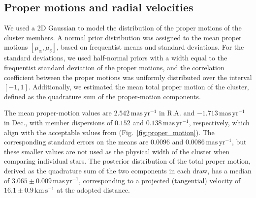 \documentclass{aa}
\begin{document}
\subsection{Proper motions and radial velocities}\label{subsec:pmrv}
We used a 2D Gaussian to model the distribution of the proper motions of the cluster members. A normal prior distribution was assigned to the mean proper motions $\left[\overline{\mu_\alpha},\overline{\mu_\delta}\right]$, based on frequentist means and standard deviations. For the standard deviations, we used half-normal priors with a width equal to the frequentist standard deviation of the proper motions, and the correlation coefficient between the proper motions was uniformly distributed over the interval $[-1, 1]$. Additionally, we estimated the mean total proper motion of the cluster, defined as the quadrature sum of the proper-motion components.

The mean proper-motion values are $2.542\,\mathrm{mas\,yr^{-1}}$ in R.A. and $-1.713\,\mathrm{mas\,yr^{-1}}$ in Dec., with member dispersions of $0.152$ and $0.138\,\mathrm{mas\,yr^{-1}}$, respectively, which align with the acceptable values from \citet{2023MNRAS.526.4107P} (Fig.~\ref{fig:proper_motion}). The corresponding standard errors on the means are $0.0096$ and $0.0086\,\mathrm{mas\,yr^{-1}}$, but these smaller values are not used as the physical width of the cluster when comparing individual stars. The posterior distribution of the total proper motion, derived as the quadrature sum of the two components in each draw, has a median of $3.065 \pm 0.009\,\mathrm{mas\,yr^{-1}}$, corresponding to a projected (tangential) velocity of $16.1 \pm 0.9\,\mathrm{km\,s^{-1}}$ at the adopted distance.
\end{document}
